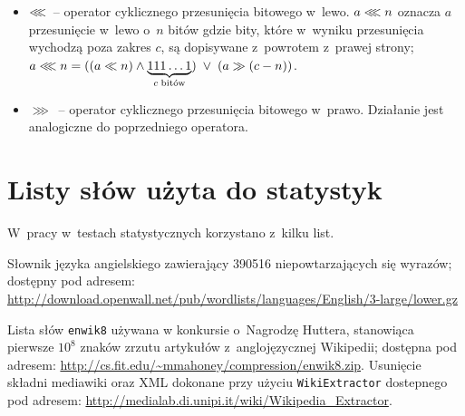 \documentclass[12pt,a4paper,twoside]{article}
\newcounter{wlcounter} %
\begin{document}
\begin{appendices}
\begin{itemize}
        \item $\llless$~-- operator cyklicznego przesunięcia bitowego w~lewo.
        $a \llless n$ oznacza $a$ przesunięcie w~lewo o~$n$ bitów gdzie bity,
        które w~wyniku przesunięcia wychodzą poza zakres $c$, są dopisywane
        z~powrotem z~prawej strony; $a \llless n =\break ((a \ll n) \land
        \underbrace{111\ldots1}_{c\;\text{bitów}}) \;\lor\; (a \gg (c-n))$.

        \item $\ggg$~-- operator cyklicznego przesunięcia bitowego w~prawo.
        Działanie jest analogiczne do poprzedniego operatora.

    \end{itemize}

\section{Listy słów użyta do statystyk}
\label{app:wordlists}
W~pracy w~testach statystycznych korzystano z~kilku list.

    \begin{myenumerate}

        \item {}\label{wl:english_wordlist} Słownik
        języka angielskiego zawierający 390516 niepowtarzających się wyrazów;
        dostępny pod adresem:
        \url{http://download.openwall.net/pub/wordlists/languages/English/3-large/lower.gz}

        \item {}\label{wl:wiki_wordlist} Lista słów
        \texttt{enwik8} używana w konkursie o~Nagrodzę Huttera, stanowiąca
        pierwsze $10^8$ znaków zrzutu artykułów z~anglojęzycznej
        \mbox{Wikipedii}; dostępna pod adresem:
        \url{http://cs.fit.edu/~mmahoney/compression/enwik8.zip}. Usunięcie
        składni mediawiki oraz XML dokonane przy użyciu \texttt{WikiExtractor}
        dostepnego pod adresem:
        \url{http://medialab.di.unipi.it/wiki/Wikipedia_Extractor}.

    \end{myenumerate}


\end{appendices}
\end{document}
